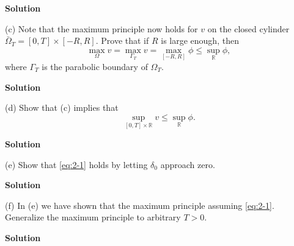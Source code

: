 \documentclass{article}
\begin{document}
\textbf{Solution}

\vspace{5mm}

(c) Note that the maximum principle now holds for $v$ on the closed
cylinder $\bar{\Omega}_T = [0, T] \times [-R, R]$. Prove that if $R$ is
large enough, then
%
\begin{equation*}
    \max_\Omega v = \max_{\Gamma_T} v = \max_{[-R, R]} \phi \leq \sup_\mathbb{R} \phi
    ,
\end{equation*}
%
where $\Gamma_T$ is the parabolic boundary of $\Omega_T$.

\textbf{Solution}

\vspace{5mm}

(d) Show that (c) implies that
%
\begin{equation*}
    \sup_{[0, T] \times \mathbb{R}} v \leq \sup_\mathbb{R} \phi
    .
\end{equation*}

\textbf{Solution}

\vspace{5mm}

(e) Show that \eqref{eq:2-1} holds by letting $\delta_0$ approach zero.

\textbf{Solution}

\vspace{5mm}

(f) In (e) we have shown that the maximum principle assuming
\eqref{eq:2-1}. Generalize the maximum principle to arbitrary $T > 0$.

\textbf{Solution}
\end{document}
